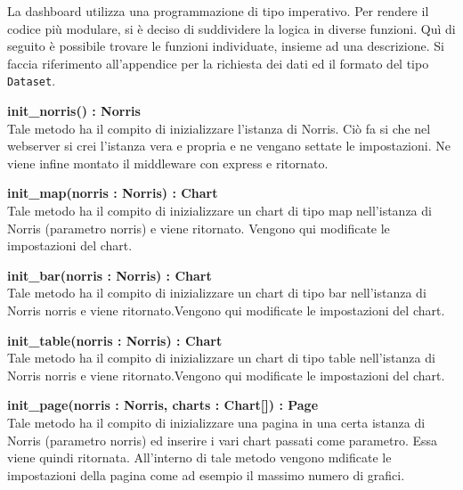 
        La dashboard utilizza una programmazione di tipo imperativo. Per rendere il codice più modulare, si è deciso di suddividere la logica in diverse funzioni. Quì di seguito è possibile trovare le funzioni individuate, insieme ad una descrizione. Si faccia riferimento all'appendice  per la richiesta dei dati ed il formato del tipo \texttt{Dataset}.

        \begin{description}

            \item \textbf{init\_norris() : Norris} \\
            Tale metodo ha il compito di inizializzare l'istanza di Norris. Ciò fa si che nel webserver si crei l'istanza vera e propria e ne vengano settate le impostazioni. Ne viene infine montato il middleware con express e ritornato.
            
            \item \textbf{init\_map(norris : Norris) : Chart} \\
            Tale metodo ha il compito di inizializzare un chart di tipo map nell'istanza di Norris (parametro norris) e viene ritornato. Vengono qui modificate le impostazioni del chart.
            
            \item \textbf{init\_bar(norris : Norris) : Chart} \\
            Tale metodo ha il compito di inizializzare un chart di tipo bar nell'istanza di Norris norris e viene ritornato.Vengono qui modificate le impostazioni del chart.
            
            \item \textbf{init\_table(norris : Norris) : Chart} \\
            Tale metodo ha il compito di inizializzare un chart di tipo table nell'istanza di Norris norris e viene ritornato.Vengono qui modificate le impostazioni del chart.
            
            \item \textbf{init\_page(norris : Norris, charts : Chart[]) : Page} \\
            Tale metodo ha il compito di inizializzare una pagina in una certa istanza di Norris (parametro norris) ed inserire i vari chart passati come parametro. Essa viene quindi ritornata. All'interno di tale metodo vengono mdificate le impostazioni della pagina come ad esempio il massimo numero di grafici.
            

\end{description}
